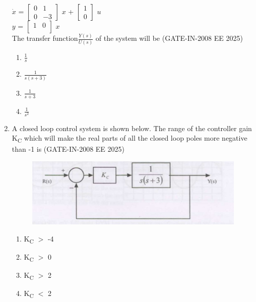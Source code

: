 \documentclass[journal,12pt,onecolumn]{IEEEtran}
\theoremstyle{remark}
\begin{document}
\begin{enumerate}[label=Q.\arabic*,start=1]
$\dot{x}$ = 
$\begin{bmatrix}
0 &1 \\
0 & -3
\end{bmatrix}$ $x$ + 
$\begin{bmatrix}
1 \\
0
\end{bmatrix}$ $u$ \\
$y$ = 
 $\begin{bmatrix}
1 & 0 \\
\end{bmatrix}$ $x$ \\  
The transfer function$\frac{Y(s)}{U(s)}$ of the system will be (GATE-IN-2008 EE 2025)
           \begin{enumerate} 
              \item $\frac{1}{s}$           
              \item $\frac{1}{s(s+3)}$
              \item $\frac{1}{s+3}$
              \item $\frac{1}{s^2}$
            \end{enumerate}

            
\item  A closed loop control system is shown below. The range of the controller gain K\textsubscript{C}  which will
make the real parts of all the closed loop poles more negative than -1 is (GATE-IN-2008 EE 2025)
\begin{figure}[H]
    \centering
    \includegraphics[width=0.5\linewidth]{figs/i30.jpg}
    \label{fig:placeholder30}
\end{figure}
           \begin{enumerate} 
              \item K\textsubscript{C} $>$ -4         
              \item K\textsubscript{C} $>$ 0
              \item K\textsubscript{C} $>$ 2
              \item K\textsubscript{C} $<$ 2
            \end{enumerate}



\end{enumerate}
\end{document}
